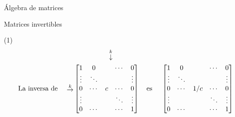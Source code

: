 \begin{chapter}{\'Algebra de matrices}
\begin{section}{Matrices invertibles}
\begin{ejemplo*}
            (1) 
            \begin{align*}
            &\begin{matrix}
            {}^{}&{}^{}&{}^{}&{}^{}&{}^{}&\overset{k}{\downarrow}&{}^{}&{}^{}&{}^{}
            \end{matrix} \\
            \text{La inversa de \quad}
            \begin{matrix}
            {}^{}\\
            {}^{}\\
            \overset{k}{\to}\\
            {}^{}\\
            {}^{}
            \end{matrix}
            &\begin{bmatrix}
            1 & 0 &  &\cdots & 0  \\
            \vdots  & \ddots  & & & \vdots \\
            0 & \cdots &c &\cdots &0 \\
            \vdots  &   & &\ddots & \vdots \\
            0  & \cdots  & &\cdots & 1
            \end{bmatrix}
            \text{\quad es \quad}
            \begin{bmatrix}
            1 & 0 &  &\cdots & 0  \\
            \vdots  & \ddots  & & & \vdots \\
            0 & \cdots &1/c &\cdots &0 \\
            \vdots  &   & &\ddots & \vdots \\
            0  & \cdots  & &\cdots & 1
            \end{bmatrix}
            \end{align*}
            

\end{ejemplo*}
\end{section}
\end{chapter}
